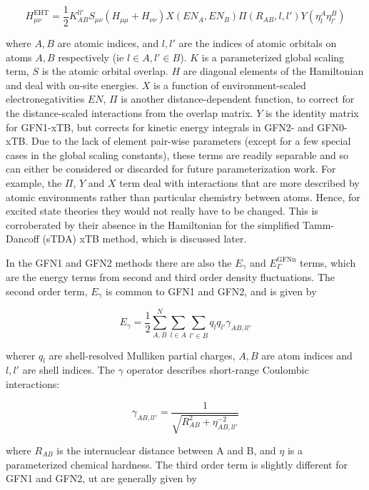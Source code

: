 \begin{equation}
H_{\mu\nu}^{\text{EHT}} = \frac{1}{2} K_{AB}^{ll'}S_{\mu\nu}\left(H_{\mu\mu} + H_{\nu\nu}\right)X\left(EN_A, EN_B\right)\Pi\left(R_{AB}, l, l'\right)Y\left(\eta^A_l\eta^B_{l'}\right)
\end{equation}

where $A,B$ are atomic indices, and $l,l'$ are the indices of atomic orbitals on 
atoms $A, B$ respectively (ie $l \in A, l' \in B$). $K$ is a parameterized global 
scaling term, $S$ is the atomic orbital overlap. $H$ are diagonal elements of the 
Hamiltonian and deal with on-site energies. $X$ is a function of environment-scaled 
electronegativities $EN$, $\Pi$ is another distance-dependent function, to correct 
for the distance-scaled interactions from the overlap matrix. $Y$ is the identity 
matrix for GFN1-xTB, but corrects for kinetic energy integrals in GFN2- and GFN0-xTB. 
Due to the lack of element pair-wise parameters (except for a few special cases 
in the global scaling constants), these terms are readily separable and so can either 
be considered or discarded for future parameterization work. For example, the $\Pi$,
$Y$ and $X$ term deal with interactions that are more described by atomic environments 
rather than particular chemistry between atoms. Hence, for excited state theories they 
would not really have to be changed. This is corroberated by their absence in the 
Hamiltonian for the simplified Tamm-Dancoff (sTDA) xTB\cite{Grimme2016} method, 
which is discussed later.

In the GFN1 and GFN2 methods there are also the $E_\gamma$ and $E_\Gamma^{\text{GFNn}}$ 
terms, which are the energy terms from second and third order density fluctuations. 
The second order term, $E_\gamma$ is common to GFN1 and GFN2, and is given by

\begin{equation}
E_\gamma = \frac{1}{2} \sum^{N}_{A,B} \sum_{l \in A} \sum_{l' \in B} q_l q_{l'} \gamma_{AB, ll'}
\end{equation}

wherer $q_l$ are shell-resolved Mulliken partial charges, $A,B$ are atom indices 
and $l,l'$ are shell indices. The $\gamma$ operator describes short-range Coulombic 
interactions:

\begin{equation}
\gamma_{AB, ll'} = \frac{1}{\sqrt{R^2_{AB} + \eta^{-2}_{AB, ll'}}}
\end{equation}

where $R_{AB}$ is the internuclear distance between A and B, and $\eta$ is a parameterized 
chemical hardness. The third order term is slightly different for GFN1 and GFN2,
 ut are generally given by

